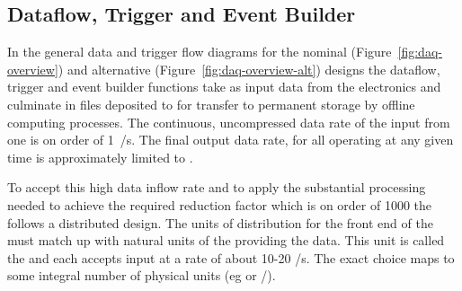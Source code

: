 
\subsection{Dataflow, Trigger and Event Builder}
\label{sec:fd-daq-hlt}


In the general data and trigger flow diagrams for the nominal
(Figure~\ref{fig:daq-overview}) and alternative
(Figure~\ref{fig:daq-overview-alt}) designs the dataflow, trigger and
event builder functions take as input data from the 
electronics and culminate in files deposited to  for
transfer to permanent storage by offline computing processes.  
The continuous, uncompressed data rate of the input from one
 is on order of \SI{1}{\TB/\s}. 
The final output data rate, for all  operating at
any given time is approximately limited to \offsitegbyteps. 

To accept this high data inflow rate and to apply the substantial
processing needed to achieve the required reduction factor which is on
order of \num{1000} the  follows a distributed design.
The units of distribution for the front end of the  must match up
with natural units of the  providing the data. 
This unit is called the  and each accepts input at a
rate of about 10-20 \si{\GB/\s}. 
The exact choice maps to some integral number of physical
 units (eg   or 
/).

